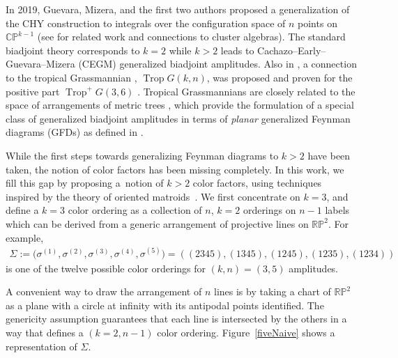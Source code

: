 \documentclass[pdftex]{sigma}
\theoremstyle{definition}
\numberwithin{equation}{section}
\begin{document}
In 2019, Guevara, Mizera, and the first two authors proposed a generalization of the CHY construction to integrals over the configuration space of $n$ points on $\mathbb{CP}^{k-1}$ \cite{Cachazo:2019ngv} (see \cite{Arkani-Hamed:2019mrd,Drummond:2019qjk,Drummond:2020kqg, Gates:2021tnp,He:2020ray,He:2021zuv} for related work and connections to cluster algebras). The standard biadjoint theory corresponds to $k=2$ while $k>2$ leads to Cachazo--Early--Guevara--Mizera (CEGM) generalized biadjoint amplitudes. Also in \cite{Cachazo:2019ngv}, a connection to the tropical Grassmannian \cite{speyer2004tropical}, $\operatorname{Trop} G(k,n)$, was proposed and proven for the positive part $\operatorname{Trop}^+G(3,6)$ \cite{speyer2005tropical}. Tropical Grassmannians are closely related to the space of arrangements of metric trees \cite{herrmann2008draw}, which provide the formulation of a special class of generalized biadjoint amplitudes in terms of {\it planar} generalized Feynman diagrams (GFDs) as defined in \cite{Borges:2019csl}.

While the first steps towards generalizing Feynman diagrams to $k>2$ have been taken, the notion of color factors has been missing completely. In this work, we fill this gap by proposing a~notion of $k>2$ color factors, using techniques inspired by the theory of oriented matroids~\cite{bjorner1999oriented}. We first concentrate on $k=3$, and define a $k=3$ color ordering as a collection of $n$, $k=2$ orderings on $n-1$ labels which can be derived from a generic arrangement of projective lines on $\mathbb{RP}^2$. For example,
\begin{gather}\label{introEx}
\Sigma := \big(\sigma^{(1)},\sigma^{(2)},\sigma^{(3)},\sigma^{(4)},\sigma^{(5)}\big)=((2345),(1345),(1245),(1235),(1234))
\end{gather}
is one of the twelve possible color orderings for $(k,n)=(3,5)$ amplitudes.

A convenient way to draw the arrangement of $n$ lines is by taking a chart of $\mathbb{RP}^2$ as a plane with a circle at infinity with its antipodal points identified. The genericity assumption guarantees that each line is intersected by the others in a way that defines a $(k=2,n-1)$ color ordering. Figure~\ref{fiveNaive} shows a representation of $\Sigma$.
\end{document}

